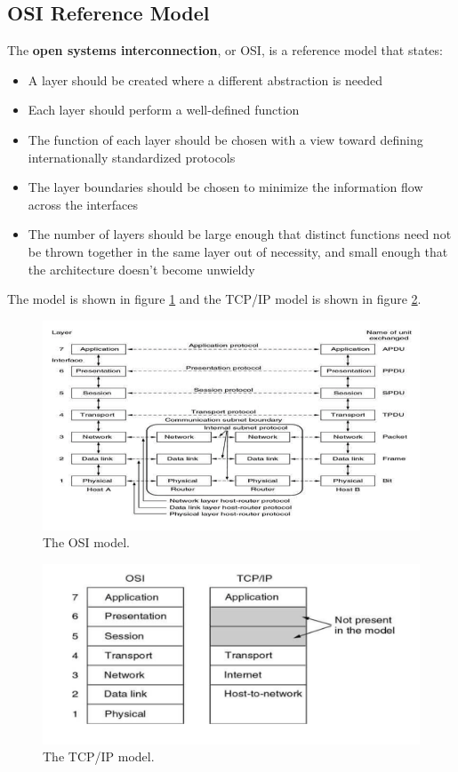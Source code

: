 \documentclass[twoside]{article}
\begin{document}
\subsection{OSI Reference Model}
The \textbf{open systems interconnection}, or OSI, is a reference model that 
states:
\begin{itemize}
    \item A layer should be created where a different abstraction is needed
    \item Each layer should perform a well-defined function
    \item The function of each layer should be chosen with a view toward
    defining internationally standardized protocols
    \item The layer boundaries should be chosen to minimize the information
    flow across the interfaces
    \item The number of layers should be large enough that distinct functions
    need not be thrown together in the same layer out of necessity, and 
    small enough that the architecture doesn't become unwieldy
\end{itemize}
The model is shown in figure \ref{fig:osi-model} and the TCP/IP model is shown
in figure \ref{fig:tcp-ip}.
\begin{figure}
  \includegraphics[width=\linewidth]{osi-model.png}
  \caption{The OSI model.}
  \label{fig:osi-model}
\end{figure}
\begin{figure}
  \includegraphics[width=\linewidth]{tcp-ip.png}
  \caption{The TCP/IP model.}
  \label{fig:tcp-ip}
\end{figure}
\end{document}
